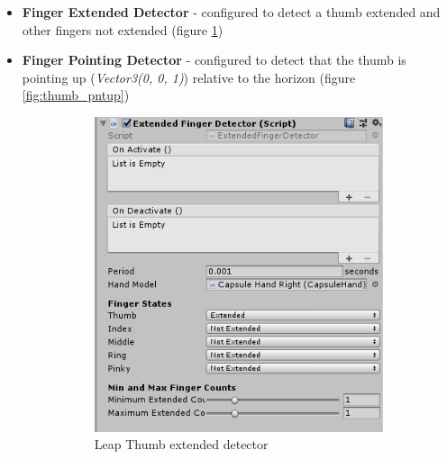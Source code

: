 \documentclass[12pt,a4paper,twoside]{report}
\begin{document}
\begin{itemize}
  \item \textbf{Finger Extended Detector} - configured to detect a thumb extended and other fingers not extended (figure \ref{fig:thumb_ext})
  \item \textbf{Finger Pointing Detector} - configured to detect that the thumb is pointing up (\textit{Vector3(0, 0, 1)}) relative to the horizon (figure \ref{fig:thumb_pntup})
  \begin{figure}[H]
    \centering
    \begin{subfigure}{0.45\linewidth}
      \includegraphics[width=0.9\linewidth]{img/ThumbExtendedDetector.PNG}
      \caption{Leap Thumb extended detector}
      \label{fig:thumb_ext}
    \end{subfigure}
    \begin{subfigure}{0.45\linewidth}

\end{subfigure}
\end{figure}
\end{itemize}
\end{document}

